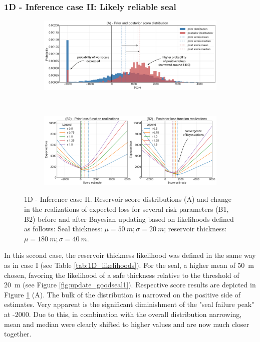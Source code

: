 				\subsubsection{1D - Inference case II: Likely reliable seal}
				\begin{figure}[h]
					\begin{subfigure}{1\textwidth}
						\centering
						\includegraphics[width=1\linewidth]{Figures/update_goodseal2.png}
					\end{subfigure}%
					\\
					\begin{subfigure}{1\textwidth}
						\centering
						\includegraphics[width=1\linewidth]{Figures/update_goodseal3.png}
					\end{subfigure}
					\caption{1D - Inference case II. Reservoir score distributions (A) and change in the realizations of expected loss for several risk parameters (B1, B2) before and after Bayesian updating based on likelihoods defined as follows: Seal thickness: $\mu = 50~m; \sigma = 20~m$; reservoir thickness: $\mu = 180~m; \sigma = 40~m$.}
					\label{fig:update_goodseal2_3}
				\end{figure}
				In this second case, the reservoir thickness likelihood was defined in the same way as in case I (see Table \ref{tab:1D_likelihoods}). For the seal, a higher mean of 50~m chosen, favoring the likelihood of a safe thickness relative to the threshold of 20~m (see Figure \ref{fig:update_goodseal1}). Respective score results are depicted in Figure \ref{fig:update_goodseal2_3} (A). The bulk of the distribution is narrowed on the positive side of estimates. Very apparent is the significant diminishment of the "seal failure peak" at -2000. Due to this, in combination with the overall distribution narrowing, mean and median were clearly shifted to higher values and are now much closer together.\\	
